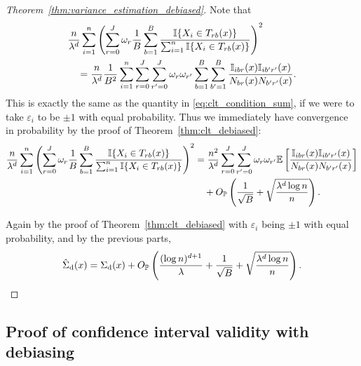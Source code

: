 \begin{proof}[Theorem~\ref{thm:variance_estimation_debiased}]
  Note that
  \begin{align*}
    &\frac{n}{\lambda^d}
    \sum_{i=1}^n
    \left(
      \sum_{r=0}^J
      \omega_r
      \frac{1}{B}
      \sum_{b=1}^B
      \frac{\mathbb{I}\{X_i \in T_{r b}(x)\}}
      {\sum_{i=1}^n \mathbb{I}\{X_i \in T_{r b}(x)\}}
    \right)^2 \\
    &\quad=
    \frac{n}{\lambda^d}
    \frac{1}{B^2}
    \sum_{i=1}^n
    \sum_{r=0}^J
    \sum_{r'=0}^J
    \omega_r
    \omega_{r'}
    \sum_{b=1}^B
    \sum_{b'=1}^B
    \frac{\mathbb{I}_{i b r}(x) \mathbb{I}_{i b' r'}(x)}
    {N_{b r}(x) N_{b' r'}(x)}.
  \end{align*}
  This is exactly the same as the quantity in
  \eqref{eq:clt_condition_sum}, if we were to take
  $\varepsilon_i$ to be $\pm 1$ with equal probability.
  Thus we immediately have convergence in probability
  by the proof of Theorem~\ref{thm:clt_debiased}:
  \begin{align*}
    \frac{n}{\lambda^d}
    \sum_{i=1}^n
    \left(
      \sum_{r=0}^J
      \omega_r
      \frac{1}{B}
      \sum_{b=1}^B
      \frac{\mathbb{I}\{X_i \in T_{r b}(x)\}}
      {\sum_{i=1}^n \mathbb{I}\{X_i \in T_{r b}(x)\}}
    \right)^2
    &=
    \frac{n^2}{\lambda^d}
    \sum_{r=0}^J
    \sum_{r'=0}^J
    \omega_r
    \omega_{r'}
    \mathbb{E} \left[
      \frac{\mathbb{I}_{i b r}(x) \mathbb{I}_{i b' r'}(x)}
      {N_{b r}(x) N_{b' r'}(x)}
    \right] \\
    &\quad+
    O_{\mathbb{P}} \left(
      \frac{1}{\sqrt B}
      + \sqrt{\frac{\lambda^d \log n}{n}}
    \right).
  \end{align*}


  Again by the proof of Theorem~\ref{thm:clt_debiased}
  with $\varepsilon_i$ being $\pm 1$ with equal probability,
  and by the previous parts,
  \begin{align*}
    \hat\Sigma_{\mathrm{d}}(x)
    = \Sigma_{\mathrm{d}}(x)
    + O_{\mathbb{P}} \left(
      \frac{(\log n)^{d+1}}{\lambda}
      + \frac{1}{\sqrt B}
      + \sqrt{\frac{\lambda^d \log n}{n}}
    \right).
  \end{align*}

\end{proof}

\subsection*{Proof of confidence interval validity with debiasing}

